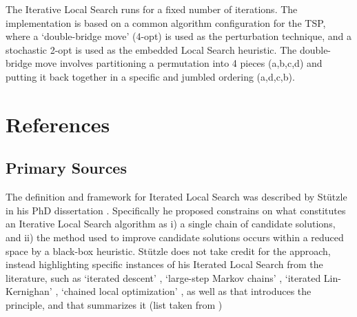 \documentclass[a4paper, 11pt]{article}
\begin{document}
The Iterative Local Search runs for a fixed number of iterations. The implementation is based on a common algorithm configuration for the TSP, where a `double-bridge move' (4-opt) is used as the perturbation technique, and a stochastic 2-opt is used as the embedded Local Search heuristic.
The double-bridge move involves partitioning a permutation into 4 pieces (a,b,c,d) and putting it back together in a specific and jumbled ordering (a,d,c,b).



\section{References}
\label{sec:references}

% 
% 
\subsection{Primary Sources}
The definition and framework for Iterated Local Search was described by St\"utzle in his PhD dissertation \cite{Stutzle1998}. Specifically he proposed constrains on what constitutes an Iterative Local Search algorithm as i) a single chain of candidate solutions, and ii) the method used to improve candidate solutions occurs within a reduced space by a black-box heuristic.
St\"utzle does not take credit for the approach, instead highlighting specific instances of his Iterated Local Search from the literature, such as `iterated descent' \cite{Baum1986}, `large-step Markov chains' \cite{Martin1991}, `iterated Lin-Kernighan' \cite{Johnson1990}, `chained local optimization' \cite{Martin1996}, as well as \cite{Baxter1981} that introduces the principle, and \cite{Johnson1997} that summarizes it (list taken from \cite{Ramalhinho-Lourenco2003})
\end{document}
